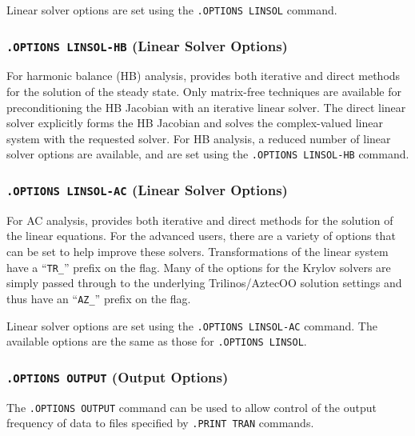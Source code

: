 Linear solver options are set using the \texttt{.OPTIONS LINSOL}
command.



\subsubsection{\texttt{.OPTIONS LINSOL-HB} (Linear Solver Options)}

For harmonic balance (HB) analysis, \Xyce{} provides both iterative 
and direct methods for the solution of the steady state.  Only matrix-free techniques
are available for preconditioning the HB Jacobian with an iterative linear solver.
The direct linear solver explicitly forms the HB Jacobian and solves the complex-valued
linear system with the requested solver.
For HB analysis, a reduced number of linear solver options are available,  
and are set using the \texttt{.OPTIONS LINSOL-HB} command.



\subsubsection{\texttt{.OPTIONS LINSOL-AC} (Linear Solver Options)}

For AC analysis, \Xyce{} provides both iterative and direct methods for the
solution of the linear equations. For the advanced users, there are a variety 
of options that can be set to help improve these solvers.  Transformations 
of the linear system have a ``\verb+TR_+'' prefix on the flag.  Many of the 
options for the Krylov solvers are simply passed through to the underlying
Trilinos/AztecOO
solution settings and thus have an ``\verb+AZ_+'' prefix on the flag.

Linear solver options are set using the \texttt{.OPTIONS LINSOL-AC}
command.  The available options
are the same as those for \texttt{.OPTIONS LINSOL}.


\subsubsection{\texttt{.OPTIONS OUTPUT} (Output Options)}

The   \verb+.OPTIONS OUTPUT+
command can be used to allow control of the output frequency of data to files specified
by  \verb+.PRINT TRAN+ commands.  

